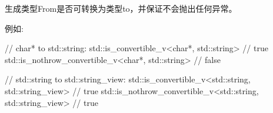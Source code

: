 




生成类型From是否可转换为类型to，并保证不会抛出任何异常。

例如:

\begin{cpp}
// char* to std::string:
std::is_convertible_v<char*, std::string> // true
std::is_nothrow_convertible_v<char*, std::string> // false

// std::string to std::string_view:
std::is_convertible_v<std::string, std::string_view> // true
std::is_nothrow_convertible_v<std::string, std::string_view> // true
\end{cpp}








